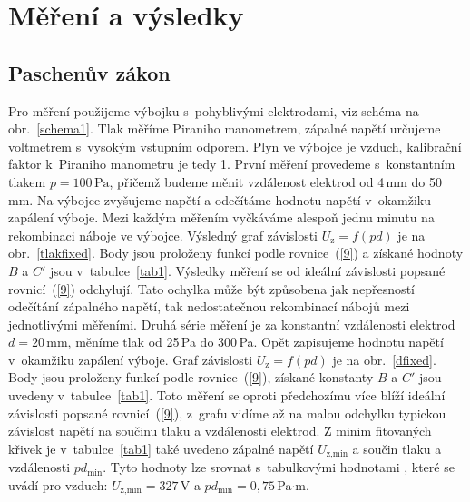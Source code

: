 \documentclass[a4paper,12pt]{article}
\begin{document}
\section{Měření a výsledky}
\subsection{Paschenův zákon}
Pro měření použijeme výbojku s~pohyblivými elektrodami, viz schéma na 
obr.~\ref{schema1}. Tlak měříme Piraniho 
manometrem, zápalné napětí určujeme voltmetrem s~vysokým vstupním odporem. Plyn 
ve výbojce je vzduch, kalibrační faktor k~Piraniho manometru je tedy 1. První 
měření provedeme s~konstantním tlakem $p = 100\,\si{\pascal}$, přičemž budeme 
měnit vzdálenost elektrod od 4\,\si{\milli\meter} do 50\,\si{\milli\meter}. Na 
výbojce zvyšujeme napětí a odečítáme hodnotu napětí v~okamžiku zapálení výboje. 
Mezi každým měřením vyčkáváme alespoň jednu minutu na rekombinaci náboje ve 
výbojce. Výsledný graf závislosti $U_\text{z} = f(pd)$ je na 
obr.~\ref{tlakfixed}. 
Body jsou proloženy funkcí podle rovnice~(\ref{9}) a získané hodnoty $B$ 
a $C'$ jsou v~tabulce~\ref{tab1}. Výsledky měření se od ideální závislosti 
popsané 
rovnicí~(\ref{9}) odchylují. Tato ochylka může být způsobena jak 
nepřesností odečítání zápalného napětí, tak nedostatečnou rekombinací nábojů 
mezi jednotlivými měřeními. 
Druhá série měření je za konstantní vzdálenosti elektrod $d = 
20\,\si{\milli\meter}$, 
měníme tlak od 25\,\si{\pascal} do 300\,\si{\pascal}. Opět zapisujeme hodnotu 
napětí v~okamžiku zapálení výboje. Graf závislosti $U_\text{z} = f(pd)$ je na 
obr.~\ref{dfixed}. Body jsou proloženy funkcí podle rovnice~(\ref{9}), získané 
konstanty 
$B$ a $C'$ jsou uvedeny v~tabulce~\ref{tab1}. Toto měření se oproti 
předchozímu více 
blíží ideální závislosti popsané rovnicí~(\ref{9}), z~grafu vidíme až na malou 
odchylku typickou závislost napětí na součinu tlaku a vzdálenosti elektrod.
Z minim fitovaných křivek je v~tabulce~\ref{tab1} také uvedeno zápalné napětí 
$U_\text{z,min}$ a 
součin tlaku a vzdálenosti $pd_{\text{min}}$. Tyto hodnoty 
lze srovnat s~tabulkovými hodnotami \cite{wiki}, které se uvádí pro vzduch: 
$U_\text{z,min} = 327$\,V a $pd_{\text{min}} = 0,75$\,Pa$\cdot$m.
\end{document}
